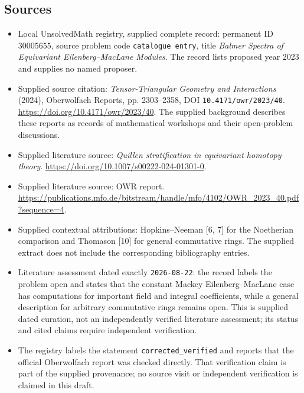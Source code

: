 \documentclass[11pt]{article}
\begin{document}
\subsection{Sources}
\begin{itemize}
\item Local UnsolvedMath registry, supplied complete record: permanent ID \(30005655\), source problem code \texttt{catalogue entry}, title \emph{Balmer Spectra of Equivariant Eilenberg--MacLane Modules}. The record lists proposed year 2023 and supplies no named proposer.
\item Supplied source citation: \emph{Tensor-Triangular Geometry and Interactions} (2024), Oberwolfach Reports, pp. 2303--2358, DOI \texttt{10.4171/owr/2023/40}. \url{https://doi.org/10.4171/owr/2023/40}. The supplied background describes these reports as records of mathematical workshops and their open-problem discussions.
\item Supplied literature source: \emph{Quillen stratification in equivariant homotopy theory}. \url{https://doi.org/10.1007/s00222-024-01301-0}.
\item Supplied literature source: OWR report. \url{https://publications.mfo.de/bitstream/handle/mfo/4102/OWR_2023_40.pdf?sequence=4}.
\item Supplied contextual attributions: Hopkins--Neeman [6, 7] for the Noetherian comparison and Thomason [10] for general commutative rings. The supplied extract does not include the corresponding bibliography entries.
\item Literature assessment dated exactly \texttt{2026-08-22}: the record labels the problem open and states that the constant Mackey Eilenberg--MacLane case has computations for important field and integral coefficients, while a general description for arbitrary commutative rings remains open. This is supplied dated curation, not an independently verified literature assessment; its status and cited claims require independent verification.
\item The registry labels the statement \texttt{corrected\_verified} and reports that the official Oberwolfach report was checked directly. That verification claim is part of the supplied provenance; no source visit or independent verification is claimed in this draft.
\end{itemize}
\end{document}

